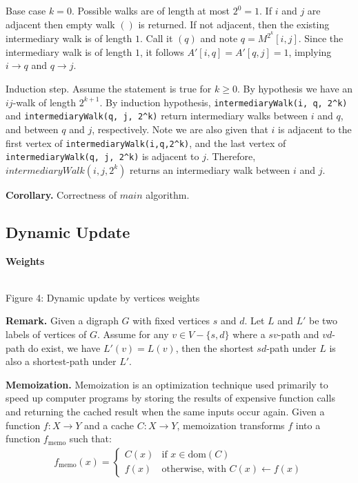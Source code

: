 \documentclass[pdflatex,sn-mathphys-num]{sn-jnl}%
\begin{document}
Base case $k = 0$. Possible walks are of length at most $2^0 = 1$. If $i$ and $j$ are adjacent then empty walk $()$ is returned. If not adjacent, then the existing intermediary walk is of length $1$. Call it $(q)$ and note $q = M^{2^k}[i,j]$. Since the intermediary walk is of length $1$, it follows $A'[i,q] = A'[q,j] = 1$, implying $i \rightarrow q$ and $q \rightarrow j$.

Induction step. Assume the statement is true for $k \geq 0$. By hypothesis we have an $ij$-walk of length $2^{k+1}$. By induction hypothesis, \verb#intermediaryWalk(i, q, 2^k)# and \verb#intermediaryWalk(q, j, 2^k)# return intermediary walks between $i$ and $q$, and between $q$ and $j$, respectively. Note we are also given that $i$ is adjacent to the first vertex of \verb#intermediaryWalk(i,q,2^k)#, and the last vertex of \verb#intermediaryWalk(q, j, 2^k)# is adjacent to $j$. Therefore, $intermediaryWalk(i,j,2^k)$ returns an intermediary walk between $i$ and $j$.

\textbf{Corollary.} Correctness of $main$ algorithm.


\subsection{Dynamic Update}

\textbf{Weights}

\begin{center}
     \\
    Figure 4: Dynamic update by vertices weights
\end{center}

\textbf{Remark.} Given a digraph $G$ with fixed vertices $s$ and $d$. Let $L$ and $L'$ be two labels of vertices of $G$. Assume for any $v \in V - \{s,d\}$ where a $sv$-path and $vd$-path do exist, we have $L'(v) = L(v)$, then the shortest $sd$-path under $L$ is also a shortest-path under $L'$.

\textbf{Memoization.} Memoization is an optimization technique used primarily to speed up computer programs by storing the results of expensive function calls and returning the cached result when the same inputs occur again. Given a function $f: X \to Y$ and a cache $C: X \to Y$, memoization transforms $f$ into a function $f_{\text{memo}}$ such that:
\begin{align*}
  f_{\text{memo}}(x) = 
  \begin{cases} 
  C(x) & \text{if } x \in \text{dom}(C) \\
  f(x) & \text{otherwise, with } C(x) \leftarrow f(x)
  \end{cases}
\end{align*}
\end{document}
